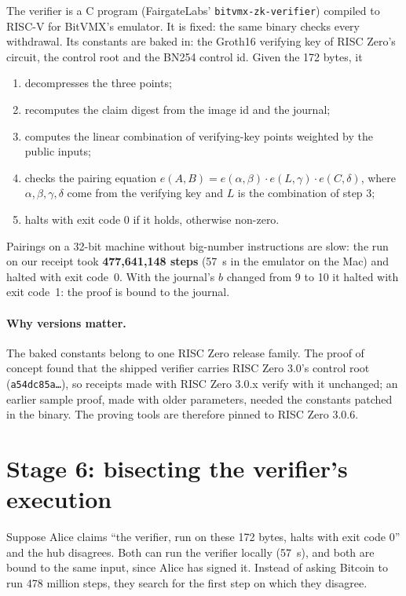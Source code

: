 \documentclass[11pt]{article}
\begin{document}
The verifier is a C program (FairgateLabs' \texttt{bitvmx-zk-verifier})
compiled to RISC-V for BitVMX's emulator. It is fixed: the same binary
checks every withdrawal. Its constants are baked in: the Groth16
verifying key of RISC Zero's circuit, the control root and the BN254
control id. Given the 172 bytes, it
\begin{enumerate}[leftmargin=1.5em]
\item decompresses the three points;
\item recomputes the claim digest from the image id and the journal;
\item computes the linear combination of verifying-key points weighted
  by the public inputs;
\item checks the pairing equation
  $e(A,B) = e(\alpha,\beta)\cdot e(L,\gamma)\cdot e(C,\delta)$,
  where $\alpha,\beta,\gamma,\delta$ come from the verifying key and $L$
  is the combination of step 3;
\item halts with exit code 0 if it holds, otherwise non-zero.
\end{enumerate}
Pairings on a 32-bit machine without big-number instructions are slow:
the run on our receipt took \textbf{477,641,148 steps} (57~s in the
emulator on the Mac) and halted with exit code~0. With the journal's $b$
changed from 9 to 10 it halted with exit code~1: the proof is bound to
the journal.

\paragraph{Why versions matter.} The baked constants belong to one RISC
Zero release family. The proof of concept found that the shipped
verifier carries RISC Zero 3.0's control root (\texttt{a54dc85a\ldots}),
so receipts made with RISC Zero 3.0.x verify with it unchanged; an
earlier sample proof, made with older parameters, needed the constants
patched in the binary. The proving tools are therefore pinned to RISC
Zero 3.0.6.

\section{Stage 6: bisecting the verifier's execution}
\label{sec:bisection}

Suppose Alice claims ``the verifier, run on these 172 bytes, halts with
exit code 0'' and the hub disagrees. Both can run the verifier locally
(57~s), and both are bound to the same input, since Alice has signed it.
Instead of asking Bitcoin to run 478 million steps, they search for the
first step on which they disagree.
\end{document}
